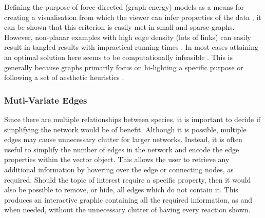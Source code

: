 Defining the purpose of force-directed (graph-energy) models as a means for creating a visualisation from which the viewer can infer properties of the data \citep{noack}, it can be shown that this criterion is easily met in small and sparse graphs. However, non-planar examples with high edge density (lots of links) can easily result in tangled results with impractical running times \citep{tvg}. In most cases attaining an optimal solution here seems to be computationally infeasible \citep{nicelyanneal}. This is generally because graphs primarily focus on hi-lighting a specific purpose or following a set of aesthetic heuristics \citep{eyetrack}. 

\subsubsection{Muti-Variate Edges}
Since there are multiple relationships between species, it is important to decide if simplifying the network would be of benefit. Although it is possible, multiple edges may cause unnecessary clutter for larger networks. Instead, it is often useful to simplify the number of edges in the network and encode the edge properties within the vector object. This allows the user to retrieve any additional information by hovering over the edge or connecting nodes, as required. Should the topic of interest require a specific property, then it would also be possible to remove, or hide, all edges which do not contain it. This produces an interactive graphic containing all the required information, as and when needed, without the unnecessary clutter of having every reaction shown. 
% 

% 





